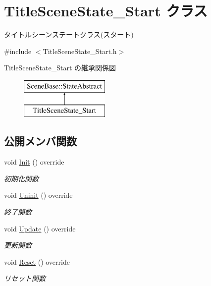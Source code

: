 \hypertarget{class_title_scene_state___start}{}\section{Title\+Scene\+State\+\_\+\+Start クラス}
\label{class_title_scene_state___start}


タイトルシーンステートクラス(スタート)  




{\ttfamily \#include $<$Title\+Scene\+State\+\_\+\+Start.\+h$>$}

Title\+Scene\+State\+\_\+\+Start の継承関係図\begin{figure}[H]
\begin{center}
\leavevmode
\includegraphics[height=2.000000cm]{class_title_scene_state___start}
\end{center}
\end{figure}
\subsection*{公開メンバ関数}
\begin{DoxyCompactItemize}
\item 
void \mbox{\hyperlink{class_title_scene_state___start_a3e785ba088ac3fd0989fd657e5d0cd34}{Init}} () override
\begin{DoxyCompactList}\small\item\em 初期化関数 \end{DoxyCompactList}\item 
void \mbox{\hyperlink{class_title_scene_state___start_a5bcb4d7a9250ea1c0041c38616ffabfe}{Uninit}} () override
\begin{DoxyCompactList}\small\item\em 終了関数 \end{DoxyCompactList}\item 
void \mbox{\hyperlink{class_title_scene_state___start_a2e98cf6810711b58766d7147168d02eb}{Update}} () override
\begin{DoxyCompactList}\small\item\em 更新関数 \end{DoxyCompactList}\item 
void \mbox{\hyperlink{class_title_scene_state___start_af4dfe902a4391ca8f0cff5d1aa9507f8}{Reset}} () override
\begin{DoxyCompactList}\small\item\em リセット関数 \end{DoxyCompactList}\end{DoxyCompactItemize}
